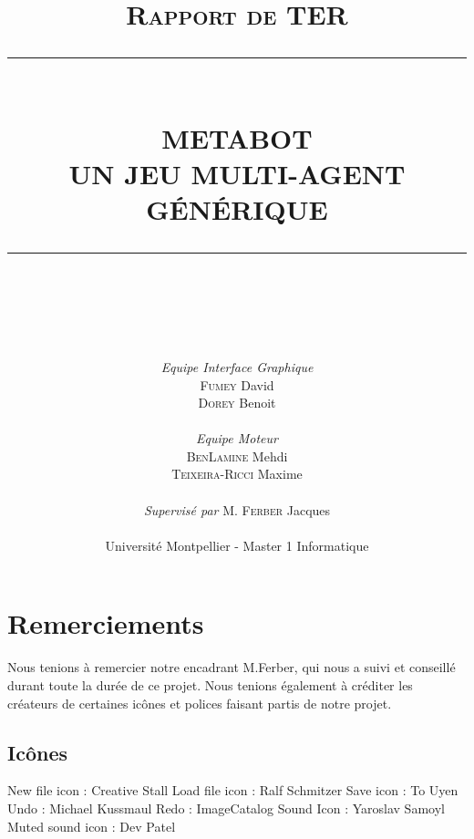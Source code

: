 \documentclass{report}
\newcommand{\HRule}[1]{\rule{\linewidth}{#1}}
\begin{document}
\title{\normalsize \textsc{Rapport de TER}
		\\ [1.5cm]
		\HRule{0.5pt} \\
		\LARGE \textbf{\uppercase{Metabot\\Un jeu multi-agent générique}}\\\HRule{0.5pt} \\}

\date{}

\author{\\[0.5cm] \textit{Equipe Interface Graphique}\\
		\textsc{Fumey} David \\
	\textsc{Dorey} Benoit \\[0.15cm] \\
	\textit{Equipe Moteur} \\	
	\textsc{BenLamine} Mehdi \\
	\textsc{Teixeira-Ricci} Maxime \\ [0.15cm] \\
	\textit{Supervisé par} M. \textsc{Ferber} Jacques\\ [2.5cm]\\
	Université Montpellier - Master 1 Informatique}

\maketitle


\chapter*{Remerciements}
Nous tenions à remercier notre encadrant M.Ferber, qui nous a suivi et conseillé durant toute la durée de ce projet.\newline
Nous tenions également à créditer les créateurs de certaines icônes et polices faisant partis de notre projet.

\section*{Icônes}
\noindent
New file icon : Creative Stall\newline
Load file icon : Ralf Schmitzer\newline
Save icon : To Uyen\newline
Undo : Michael Kussmaul\newline
Redo : ImageCatalog\newline
Sound Icon : Yaroslav Samoyl\newline
Muted sound icon : Dev Patel\newline
\end{document}
